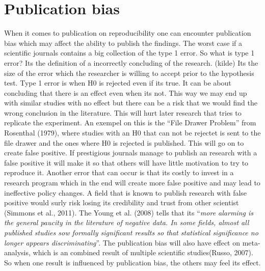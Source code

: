 \documentclass[
  british,
  a4paper,
]{article}
\begin{document}
\section{Publication bias}\label{publication-bias}

When it comes to publication on reproducibility one can encounter
publication bias which may affect the ability to publish the findings.
The worst case if a scientific journals contains a big collection of the
type 1 error. So what is type 1 error? Its the definition of a
incorrectly concluding of the research. (kilde) Its the size of the
error which the researcher is willing to accept prior to the hypothesis
test. Type 1 error is when H0 is rejected even if its true. It can be
about concluding that there is an effect even when its not. This way we
may end up with similar studies with no effect but there can be a risk
that we would find the wrong conclusion in the literature. This will
hurt later research that tries to replicate the experiment. An exempel
on this is the ``File Drawer Problem'' from Rosenthal (1979), where
studies with an H0 that can not be rejectet is sent to the file drawer
and the ones where H0 is rejected is published. This will go on to
create false positive. If prestigious journals manage to publish an
research with a false positive it will make it so that others will have
little motivation to try to reproduce it. Another error that can occur
is that its costly to invest in a research program which in the end will
create more false positive and may lead to ineffective policy changes. A
field that is known to publish research with false positive would surly
risk losing its credibility and trust from other scientist (Simmons et
al., 2011). The Young et al. (2008) tells that its ``\emph{more alarming
is the general paucity in the literature of negative data. In some
fields, almost all published studies sow formally significant results so
that statistical significance no longer appears discriminating}''. The
publication bias will also have effect on meta-analysis, which is an
combined result of multiple scientific studies(Russo, 2007). So when one
result is influenced by publication bias, the others may feel its
effect.
\end{document}
